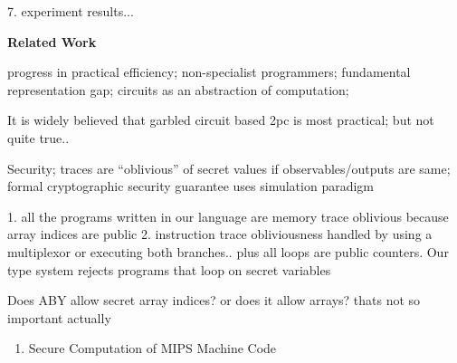 7. experiment results...



\noindent\textbf{Related Work}
\cite{lambdaps,wysteria}

 progress in practical efficiency; non-specialist programmers; fundamental representation gap; circuits as an abstraction of computation; 

 It is widely believed that garbled circuit based 2pc is most practical; but not quite true..

 Security; traces are ``oblivious'' of secret values if observables/outputs are same; formal cryptographic security guarantee uses simulation paradigm \cite{canetti2000} 


 1. all the programs written in our language are memory trace oblivious because array indices are public 2. instruction trace obliviousness handled by using a multiplexor or executing both branches.. plus all loops are public counters. Our type system rejects programs that loop on secret variables

 Does ABY allow secret array indices? or does it allow arrays? thats not so important actually

\begin{enumerate}
\item Secure Computation of MIPS Machine Code %

\end{enumerate}
\newpage